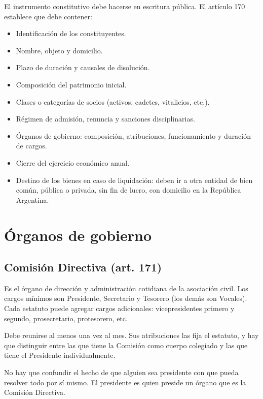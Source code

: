 \documentclass[12pt,oneside]{book}
\begin{document}
El instrumento constitutivo debe hacerse en escritura pública. El artículo 170 establece que debe contener:

\begin{itemize}
    \item Identificación de los constituyentes.
    \item Nombre, objeto y domicilio.
    \item Plazo de duración y causales de disolución.
    \item Composición del patrimonio inicial.
    \item Clases o categorías de socios (activos, cadetes, vitalicios, etc.).
    \item Régimen de admisión, renuncia y sanciones disciplinarias.
    \item Órganos de gobierno: composición, atribuciones, funcionamiento y duración de cargos.
    \item Cierre del ejercicio económico anual.
    \item Destino de los bienes en caso de liquidación: deben ir a otra entidad de bien común, pública o privada, sin fin de lucro, con domicilio en la República Argentina.
\end{itemize}

\section{Órganos de gobierno}

\subsection{Comisión Directiva (art. 171)}

Es el órgano de dirección y administración cotidiana de la asociación civil. Los cargos mínimos son Presidente, Secretario y Tesorero (los demás son Vocales). Cada estatuto puede agregar cargos adicionales: vicepresidentes primero y segundo, prosecretario, protesorero, etc.

Debe reunirse al menos una vez al mes. Sus atribuciones las fija el estatuto, y hay que distinguir entre las que tiene la Comisión como cuerpo colegiado y las que tiene el Presidente individualmente.

\begin{important}
No hay que confundir el hecho de que alguien sea presidente con que pueda resolver todo por sí mismo. El presidente es quien preside un órgano que es la Comisión Directiva.
\end{important}
\end{document}
